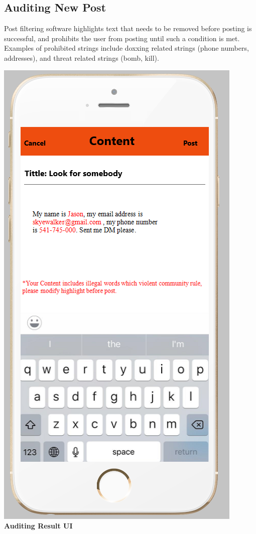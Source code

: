 \documentclass[12pt]{article}
\begin{document}
\begin{center}
\subsection{Auditing New Post}
Post filtering software highlights text that needs to be removed before posting is successful, and prohibits the user from posting until such a condition is met. Examples of prohibited strings include doxxing related strings (phone numbers, addresses), and threat related strings (bomb, kill).
\begin{center}
\includegraphics[scale=0.30]{img/ui/bad-post}\linebreak
\textbf{Auditing Result UI}


\end{center}
\end{center}
\end{document}
